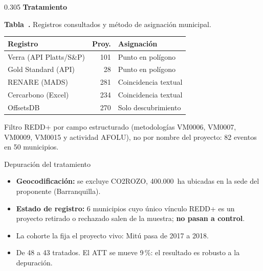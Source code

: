 \documentclass[final,t]{beamer}
\newcommand{\nota}[1]{{\color{tenue}\small #1\par}}
\newcounter{tabposter}
\newcommand{\tabcap}[2]{\refstepcounter{tabposter}\label{#1}%
  \nota{\textbf{Tabla~\thetabposter.} #2}}
\begin{document}
\begin{frame}[t]{}
\begin{columns}[t]
\begin{column}{0.305\paperwidth}
\textbf{\large Tratamiento}
\tabcap{tab:registros}{Registros consultados y método de asignación municipal.}
\begin{center}
\begin{tabularx}{\linewidth}{Xrl}
\toprule
\rowcolor{dosel}
\textcolor{papel}{\textbf{Registro}} & \textcolor{papel}{\textbf{Proy.}} &
\textcolor{papel}{\textbf{Asignación}}\\
\midrule
Verra (API Platts/S\&P) & 101 & Punto en polígono\\
Gold Standard (API)     & 28  & Punto en polígono\\
RENARE (MADS)           & 281 & Coincidencia textual\\
Cercarbono (Excel)      & 234 & Coincidencia textual\\
OffsetsDB               & 270 & Solo descubrimiento\\
\bottomrule
\end{tabularx}
\end{center}
\nota{Filtro REDD+ por campo estructurado (metodologías VM0006, VM0007, VM0009, VM0015 y actividad
AFOLU), no por nombre del proyecto: 82 eventos en 50 municipios.}

\begin{caja}{Depuración del tratamiento}
\begin{itemize}
  \item \textbf{Geocodificación:} se excluye CO2ROZO, 400.000~ha ubicadas en la sede del proponente
        (Barranquilla).
  \item \textbf{Estado de registro:} 6 municipios cuyo único vínculo REDD+ es un proyecto
        retirado o rechazado salen de la muestra; \textbf{no pasan a control}.
  \item La cohorte la fija el proyecto vivo: Mitú pasa de 2017 a 2018.
  \item[\textcolor{amazonia}{\rule{0.45ex}{0.45ex}}] De 48 a 43 tratados. El ATT se mueve 9\,\%:
        el resultado es robusto a la depuración.
\end{itemize}
\end{caja}


\end{column}
\end{columns}
\end{frame}
\end{document}
